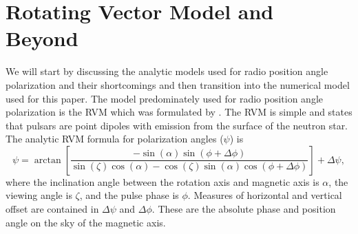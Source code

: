 \section{Rotating Vector Model and Beyond}
\label{sec:RVM}
We will start by discussing the analytic models used for 
radio position angle polarization and their shortcomings 
and then transition into the numerical model used for this paper.
The model predominately used for radio position angle polarization
is the RVM which
was formulated by \cite{radhakrishnan1969magnetic}.  The RVM is simple
and states that pulsars are point dipoles with emission
from the surface of the neutron star.  The
analytic RVM formula for polarization angles ($\psi$) is
\begin{equation}\label{eq:RVM}
\psi=\arctan\left[\frac{-\sin(\alpha)\sin(\phi+\Delta\phi)}
{\sin(\zeta) \cos(\alpha) -\cos(\zeta) \sin(\alpha) \cos(\phi+\Delta\phi)}\right]+\Delta\psi,
\end{equation}
where the inclination angle between the rotation
axis and magnetic axis is $\alpha$, the viewing angle is
$\zeta$, and the pulse phase is $\phi$. Measures of horizontal and vertical offset
are contained in $\Delta\psi$ and $\Delta\phi$.  These are the absolute phase and position angle on the 
sky of the magnetic axis.

